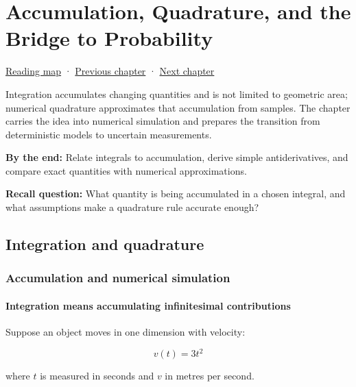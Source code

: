 \hypertarget{02-foundations-ii-ch022}{}
\chapter{Accumulation, Quadrature, and the Bridge to Probability}\label{02-foundations-ii-ch022-accumulation-quadrature-and-the-bridge-to-probability}

\hyperref[volume-reading-map]{Reading map} · \hyperref[02-foundations-ii-ch021-multivariable-derivatives-and-sensitivity]{Previous chapter} · \hyperref[02-foundations-ii-ch023-probability-models-and-measurement-error]{Next chapter}

Integration accumulates changing quantities and is not limited to geometric area; numerical quadrature approximates that accumulation from samples. The chapter carries the idea into numerical simulation and prepares the transition from deterministic models to uncertain measurements.

\textbf{By the end:} Relate integrals to accumulation, derive simple antiderivatives, and compare exact quantities with numerical approximations.

\textbf{Recall question:} What quantity is being accumulated in a chosen integral, and what assumptions make a quadrature rule accurate enough?

\section{Integration and quadrature}\label{02-foundations-ii-ch022-integration-and-quadrature}

\subsection{Accumulation and numerical simulation}\label{02-foundations-ii-ch022-accumulation-and-numerical-simulation}

\subsubsection{Integration means accumulating infinitesimal contributions}\label{02-foundations-ii-ch022-integration-means-accumulating-infinitesimal-contributions}

Suppose an object moves in one dimension with velocity:

\[
v(t)=3t^2
\]

where \(t\) is measured in seconds and \(v\) in metres per second.

